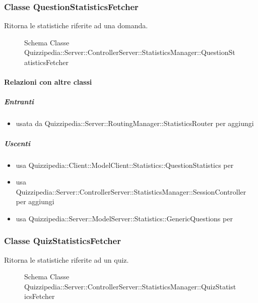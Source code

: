 \subsubsection{Classe QuestionStatisticsFetcher}
Ritorna le statistiche riferite ad una domanda.
\begin{figure}[H]
\centering
\noindent{}
\caption[Schema Classe QuestionStatisticsFetcher]{Schema Classe Quizzipedia::Server::ControllerServer::StatisticsManager::QuestionStatisticsFetcher}
\end{figure}
\paragraph{Relazioni con altre classi}
\subparagraph{Entranti}
\begin{itemize}
\item usata da Quizzipedia::Server::RoutingManager::StatisticsRouter per aggiungi
\end{itemize}
\subparagraph{Uscenti}
\begin{itemize}
\item usa Quizzipedia::Client::ModelClient::Statistics::QuestionStatistics per 
\item usa Quizzipedia::Server::ControllerServer::StatisticsManager::SessionController per aggiungi
\item usa Quizzipedia::Server::ModelServer::Statistics::GenericQuestions per 
\end{itemize}
\subsubsection{Classe QuizStatisticsFetcher}
Ritorna le statistiche riferite ad un quiz.
\begin{figure}[H]
\centering
\noindent{}
\caption[Schema Classe QuizStatisticsFetcher]{Schema Classe Quizzipedia::Server::ControllerServer::StatisticsManager::QuizStatisticsFetcher}
\end{figure}
